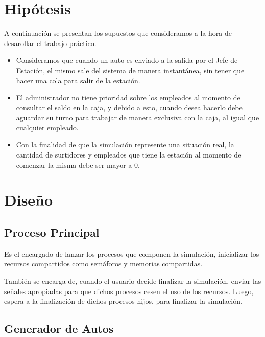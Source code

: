 \documentclass[12pt,a4paper,spanish]{article}
\begin{document}

\newpage
\tableofcontents

\section{Hipótesis}

A continuación se presentan los supuestos que consideramos a la hora de desarollar el 
trabajo práctico.


\begin{itemize}
	\item Consideramos que cuando un auto es enviado a la salida por el Jefe de Estación,
	el mismo sale del sistema de manera instantánea, sin tener que hacer una cola
	para salir de la estación.

	\item El administrador no tiene prioridad sobre los empleados al momento de consultar
	el saldo en la caja, y debido a esto, cuando desea hacerlo debe aguardar su turno para
	trabajar de manera exclusiva con la caja, al igual que cualquier empleado.

	 \item Con la finalidad de que la simulación represente una situación real, la cantidad
	 de surtidores y empleados que tiene la estación al momento de comenzar la misma debe ser 
	 mayor a 0.
\end{itemize}

\newpage

\section{Diseño}
	\subsection{Proceso Principal}

		Es el encargado de lanzar los procesos que componen la simulación, inicializar los recursos
		compartidos como semáforos y memorias compartidas.

		También se encarga de, cuando el usuario decide finalizar la simulación, enviar las señales
		apropiadas para que dichos procesos cesen el uso de los recursos. Luego, espera a la finalización
		de dichos procesos hijos, para finalizar la simulación.

	\subsection{Generador de Autos}
		
\end{document}
